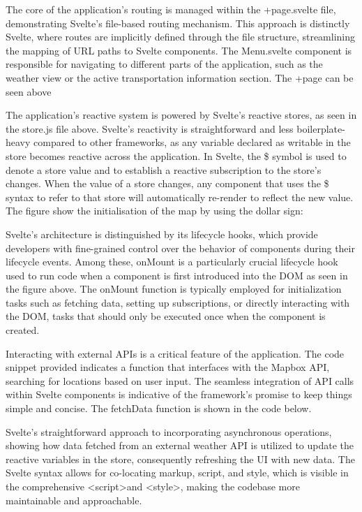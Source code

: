 

The core of the application's routing is managed within the +page.svelte file, demonstrating Svelte's file-based routing mechanism. This approach is distinctly Svelte, where routes are implicitly defined through the file structure, streamlining the mapping of URL paths to Svelte components. The Menu.svelte component is responsible for navigating to different parts of the application, such as the weather view or the active transportation information section. The +page can be seen above



The application's reactive system is powered by Svelte's reactive stores, as seen in the store.js file above. Svelte's reactivity is straightforward and less boilerplate-heavy compared to other frameworks, as any variable declared as writable in the store becomes reactive across the application. In Svelte, the \$ symbol is used to denote a store value and to establish a reactive subscription to the store's changes. When the value of a store changes, any component that uses the \$ syntax to refer to that store will automatically re-render to reflect the new value. The figure show the initialisation of the map by using the dollar sign:



Svelte's architecture is distinguished by its lifecycle hooks, which provide developers with fine-grained control over the behavior of components during their lifecycle events. Among these, onMount is a particularly crucial lifecycle hook used to run code when a component is first introduced into the DOM as seen in the figure above.
The onMount function is typically employed for initialization tasks such as fetching data, setting up subscriptions, or directly interacting with the DOM, tasks that should only be executed once when the component is created.

Interacting with external APIs is a critical feature of the application. The code snippet provided indicates a function that interfaces with the Mapbox API, searching for locations based on user input. The seamless integration of API calls within Svelte components is indicative of the framework's promise to keep things simple and concise. The fetchData function is shown in the code below.



Svelte's straightforward approach to incorporating asynchronous operations, showing how data fetched from an external weather API is utilized to update the reactive variables in the store, consequently refreshing the UI with new data.
The Svelte syntax allows for co-locating markup, script, and style, which is visible in the comprehensive \textless script\textgreater and \textless style\textgreater, making the codebase more maintainable and approachable.


